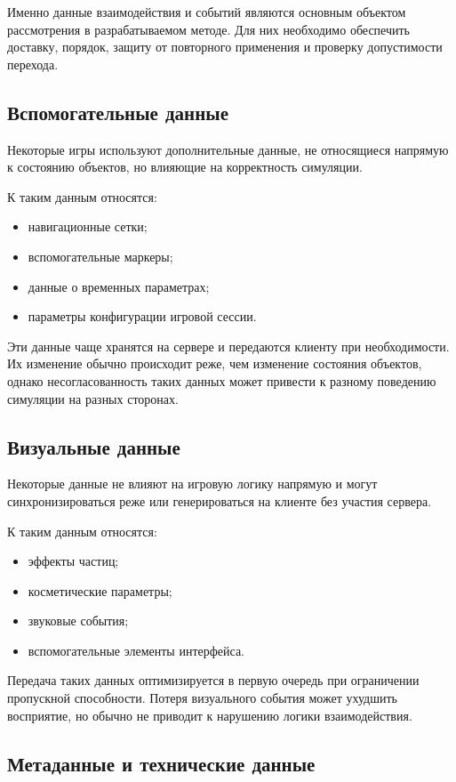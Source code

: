 Именно данные взаимодействия и событий являются основным объектом рассмотрения в разрабатываемом методе. Для них необходимо обеспечить доставку, порядок, защиту от повторного применения и проверку допустимости перехода.

\subsection{Вспомогательные данные}

Некоторые игры используют дополнительные данные, не относящиеся напрямую к состоянию объектов, но влияющие на корректность симуляции.

К таким данным относятся:
\begin{itemize}
	\item навигационные сетки;
	\item вспомогательные маркеры;
	\item данные о временных параметрах;
	\item параметры конфигурации игровой сессии.
\end{itemize}

Эти данные чаще хранятся на сервере и передаются клиенту при необходимости. Их изменение обычно происходит реже, чем изменение состояния объектов, однако несогласованность таких данных может привести к разному поведению симуляции на разных сторонах.

\subsection{Визуальные данные}

Некоторые данные не влияют на игровую логику напрямую и могут синхронизироваться реже или генерироваться на клиенте без участия сервера.

К таким данным относятся:
\begin{itemize}
	\item эффекты частиц;
	\item косметические параметры;
	\item звуковые события;
	\item вспомогательные элементы интерфейса.
\end{itemize}

Передача таких данных оптимизируется в первую очередь при ограничении пропускной способности. Потеря визуального события может ухудшить восприятие, но обычно не приводит к нарушению логики взаимодействия.

\subsection{Метаданные и технические данные}

